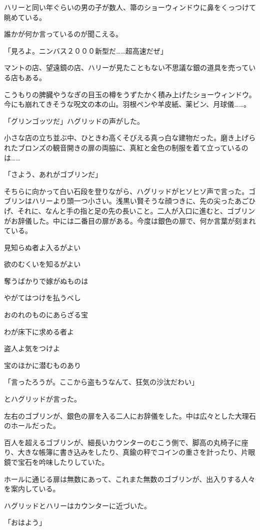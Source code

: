 \documentclass[10pt,a4paper]{article}
\begin{document}
\begin{CJK}{UTF8}{min}
ハリーと同い年ぐらいの男の子が数人、箒のショーウィンドウに鼻をくっつけて眺めている。

誰かが何か言っているのが聞こえる。

「見ろよ。ニンバス２０００新型だ……超高速だぜ」

マントの店、望遠鏡の店、ハリーが見たこともない不思議な銀の道具を売っている店もある。

こうもりの脾臓やうなぎの目玉の樽をうずたかく積み上げたショーウィンドウ。今にも崩れてきそうな呪文の本の山。羽根ペンや羊皮紙、薬ビン、月球儀……。

「グリンゴッツだ」ハグリッドの声がした。

小さな店の立ち並ぶ中、ひときわ高くそびえる真っ白な建物だった。磨き上げられたブロンズの観音開きの扉の両脇に、真紅と金色の制服を着て立っているのは……

「さよう、あれがゴブリンだ」

そちらに向かって白い石段を登りながら、ハグリッドがヒソヒソ声で言った。ゴブリンはハリーより頭一つ小さい。浅黒い賢そうな顔つきに、先の尖ったあごひげ、それに、なんと手の指と足の先の長いこと。二人が入口に進むと、ゴブリンがお辞儀した。中には二番目の扉がある。今度は銀色の扉で、何か言葉が刻まれている。



見知らぬ者よ入るがよい

欲のむくいを知るがよい

奪うばかりで嫁がぬものは

やがてはつけを払うべし

おのれのものにあらざる宝

わが床下に求める者よ

盗人よ気をつけよ

宝のほかに潜むものあり



「言ったろうが。ここから盗もうなんて、狂気の沙汰だわい」

とハグリッドが言った。

左右のゴブリンが、銀色の扉を入る二人にお辞儀をした。中は広々とした大理石のホールだった。

百人を超えるゴブリンが、細長いカウンターのむこう側で、脚高の丸椅子に座り、大きな帳簿に書き込みをしたり、真鍮の秤でコインの重さを計ったり、片眼鏡で宝石を吟味したりしていた。

ホールに通じる扉は無数にあって、これまた無数のゴブリンが、出入りする人々を案内している。

ハグリッドとハリーはカウンターに近づいた。

「おはよう」


\end{CJK}
\end{document}
